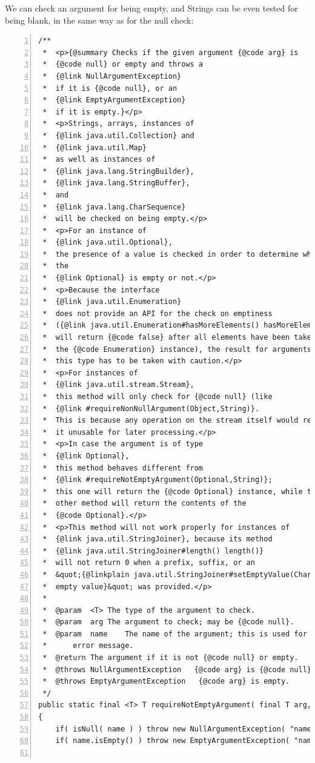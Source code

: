\documentclass[11pt,a4paper, titlepage, parskip=half, headsepline, footsepline, cleardoublepage=current, headheight=1cm]{scrbook}
\begin{document}
We can check an argument for being empty, and Strings can be even tested for being blank, in the same way as for the null check:
\begin{lstlisting}[numbers=left,caption={requireNotEmptyArgument()}]
/**
 *  <p>{@summary Checks if the given argument {@code arg} is 
 *  {@code null} or empty and throws a
 *  {@link NullArgumentException}
 *  if it is {@code null}, or an
 *  {@link EmptyArgumentException}
 *  if it is empty.}</p>
 *  <p>Strings, arrays, instances of
 *  {@link java.util.Collection} and
 *  {@link java.util.Map}
 *  as well as instances of
 *  {@link java.lang.StringBuilder},
 *  {@link java.lang.StringBuffer},
 *  and
 *  {@link java.lang.CharSequence}
 *  will be checked on being empty.</p>
 *  <p>For an instance of
 *  {@link java.util.Optional},
 *  the presence of a value is checked in order to determine whether
 *  the
 *  {@link Optional} is empty or not.</p>
 *  <p>Because the interface
 *  {@link java.util.Enumeration}
 *  does not provide an API for the check on emptiness
 *  ({@link java.util.Enumeration#hasMoreElements() hasMoreElements()}
 *  will return {@code false} after all elements have been taken from
 *  the {@code Enumeration} instance), the result for arguments of
 *  this type has to be taken with caution.</p>
 *  <p>For instances of
 *  {@link java.util.stream.Stream},
 *  this method will only check for {@code null} (like
 *  {@link #requireNonNullArgument(Object,String)}.
 *  This is because any operation on the stream itself would render 
 *  it unusable for later processing.</p>
 *  <p>In case the argument is of type
 *  {@link Optional},
 *  this method behaves different from
 *  {@link #requireNotEmptyArgument(Optional,String)};
 *  this one will return the {@code Optional} instance, while the
 *  other method will return the contents of the 
 *  {@code Optional}.</p>
 *  <p>This method will not work properly for instances of
 *  {@link java.util.StringJoiner}, because its method
 *  {@link java.util.StringJoiner#length() length()}
 *  will not return 0 when a prefix, suffix, or an
 *  &quot;{@linkplain java.util.StringJoiner#setEmptyValue(CharSequence) 
 *  empty value}&quot; was provided.</p>
 *
 *  @param  <T> The type of the argument to check.
 *  @param  arg The argument to check; may be {@code null}.
 *  @param  name    The name of the argument; this is used for the 
 *      error message.
 *  @return The argument if it is not {@code null} or empty.
 *  @throws NullArgumentException   {@code arg} is {@code null}.
 *  @throws EmptyArgumentException   {@code arg} is empty.
 */
public static final <T> T requireNotEmptyArgument( final T arg, final String name )
{
    if( isNull( name ) ) throw new NullArgumentException( "name" );
    if( name.isEmpty() ) throw new EmptyArgumentException( "name" );


\end{lstlisting}
\end{document}
